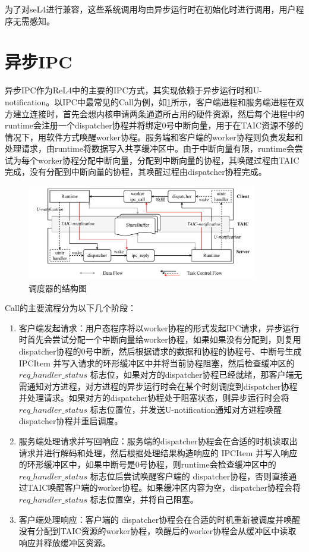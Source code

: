 为了对seL4进行兼容，这些系统调用均由异步运行时在初始化时进行调用，用户程序无需感知。

\section{异步IPC}

异步IPC作为ReL4中的主要的IPC方式，其实现依赖于异步运行时和U-notification。以IPC中最常见的Call为例，如\ref{fig:async_ipc}所示，客户端进程和服务端进程在双方建立连接时，首先会想内核申请两条通道所占用的硬件资源，然后每个进程中的runtime会注册一个dispatcher协程并将绑定0号中断向量，用于在TAIC资源不够的情况下，用软件方式唤醒worker协程。服务端和客户端的worker协程则负责发起和处理请求，由runtime将数据写入共享缓冲区中。由于中断向量有限，runtime会尝试为每个worker协程分配中断向量，分配到中断向量的协程，其唤醒过程由TAIC完成，没有分配到中断向量的协程，其唤醒过程由dispatcher协程完成。

\begin{figure}[htbp]
    \centering
    \includegraphics[width=0.9\textwidth]{figures/async_ipc.drawio.pdf}
    \caption{调度器的结构图}\label{fig:async_ipc}
  \end{figure}

Call的主要流程分为以下几个阶段：
\begin{enumerate}
    \item 客户端发起请求：用户态程序将以worker协程的形式发起IPC请求，异步运行时首先会尝试分配一个中断向量给worker协程，如果如果没有分配到，则复用dispatcher协程的0号中断，然后根据请求的数据和协程的协程号、中断号生成 IPCItem 并写入请求的环形缓冲区中并将当前协程阻塞，然后检查缓冲区的 $req\_handler\_status$ 标志位，如果对方的dispatcher协程已经就绪，那客户端无需通知对方进程，对方进程的异步运行时会在某个时刻调度到dispatcher协程并处理请求。如果对方的dispatcher协程处于阻塞状态，则异步运行时会将$req\_handler\_status$ 标志位置位，并发送U-notification通知对方进程唤醒 dispatcher协程并重启调度。
    \item 服务端处理请求并写回响应：服务端的dispatcher协程会在合适的时机读取出请求并进行解码和处理，然后根据处理结果构造响应的 IPCItem 并写入响应的环形缓冲区中，如果中断号是0号协程，则runtime会检查缓冲区中的 $req\_handler\_status$  标志位后尝试唤醒客户端的 dispatcher协程，否则直接通过TAIC唤醒客户端的worker协程。如果缓冲区内容为空，dispatcher协程会将 $req\_handler\_status$  标志位置空，并将自己阻塞。
    \item 客户端处理响应：客户端的 dispatcher协程会在合适的时机重新被调度并唤醒没有分配到TAIC资源的worker协程，唤醒后的worker协程会从缓冲区中读取响应并释放缓冲区资源。
\end{enumerate}

